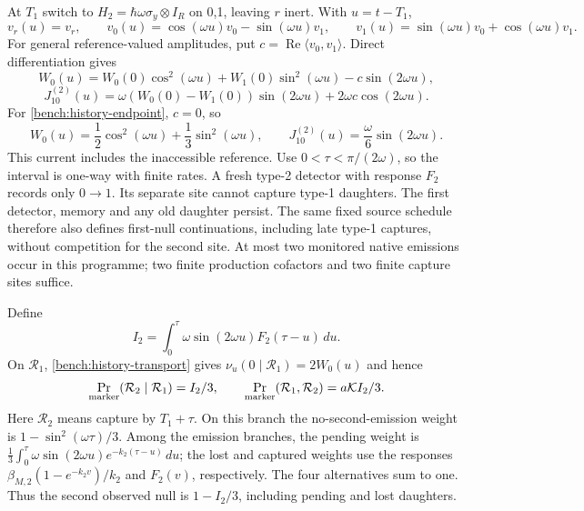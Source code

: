 \documentclass[11pt,oneside,openany]{book}
\theoremstyle{definition}
\theoremstyle{remark}\newtheorem{remark}[theorem]{Remark}
\begin{document}
At $T_1$ switch to $H_2=\hbar\omega\sigma_y\otimes I_R$ on 0,1,
leaving $r$ inert. With $u=t-T_1$,
\[
 v_r(u)=v_r,\qquad
 v_0(u)=\cos(\omega u)v_0-\sin(\omega u)v_1,\qquad
 v_1(u)=\sin(\omega u)v_0+\cos(\omega u)v_1.
\]
For general reference-valued amplitudes, put
$c=\operatorname{Re}\langle v_0,v_1\rangle$. Direct differentiation
gives
\[
 W_0(u)=W_0(0)\cos^2(\omega u)+W_1(0)\sin^2(\omega u)
                                      -c\sin(2\omega u),
\]
\[
 J^{(2)}_{10}(u)=\omega(W_0(0)-W_1(0))\sin(2\omega u)
                                      +2\omega c\cos(2\omega u).
\]
For \eqref{bench:history-endpoint}, $c=0$, so
\begin{equation}
 W_0(u)=\frac12\cos^2(\omega u)+\frac13\sin^2(\omega u),
 \qquad J^{(2)}_{10}(u)=\frac{\omega}{6}\sin(2\omega u).
 \label{bench:history-second-current}
\end{equation}
This current includes the inaccessible reference. Use
$0<\tau<\pi/(2\omega)$, so the interval is one-way with finite rates.
A fresh type-2 detector with response $F_2$ records only $0\to1$.
Its separate site cannot capture type-1 daughters. The first detector,
memory and any old daughter persist. The same fixed source schedule
therefore also defines first-null continuations, including late
type-1 captures, without competition for the second site. At most
two monitored native emissions occur in this programme; two finite
production cofactors and two finite capture sites suffice.

Define
\begin{equation}
 I_2=\int_0^\tau\omega\sin(2\omega u)F_2(\tau-u)\,du.
 \label{bench:history-I2}
\end{equation}
On $\mathcal R_1$, \eqref{bench:history-transport} gives
$\nu_u(0\mid\mathcal R_1)=2W_0(u)$ and hence
\begin{equation}
 \Pr_{\rm marker}(\mathcal R_2\mid\mathcal R_1)=I_2/3,\qquad
 \Pr_{\rm marker}(\mathcal R_1,\mathcal R_2)=a\mathcal K I_2/3.
 \label{bench:history-joint}
\end{equation}
Here $\mathcal R_2$ means capture by $T_1+\tau$. On this branch the
no-second-emission weight is $1-\sin^2(\omega\tau)/3$. Among the
emission branches, the pending weight is
$\frac13\int_0^\tau\omega\sin(2\omega u)e^{-k_2(\tau-u)}\,du$;
the lost and captured weights use the responses
$\beta_{M,2}(1-e^{-k_2v})/k_2$ and $F_2(v)$, respectively.
The four alternatives sum to one. Thus the second observed null is
$1-I_2/3$, including pending and lost daughters.
\end{document}
